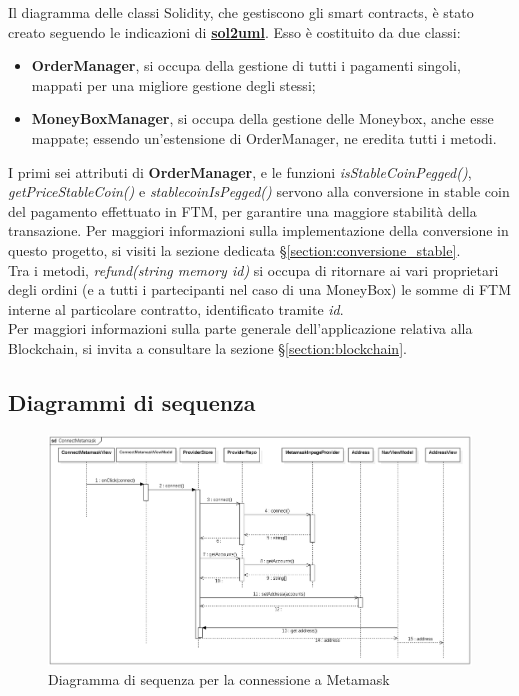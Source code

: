 Il diagramma delle classi Solidity, che gestiscono gli smart contracts, è stato creato seguendo le indicazioni di \href{https://github.com/naddison36/sol2uml}{\textbf{sol2uml}}.
Esso è costituito da due classi:
\begin{itemize}
    \item \textbf{OrderManager}, si occupa della gestione di tutti i pagamenti singoli, mappati per una migliore gestione degli stessi;
    \item \textbf{MoneyBoxManager}, si occupa della gestione delle Moneybox, anche esse mappate; essendo un'estensione di OrderManager, ne eredita tutti i metodi.
\end{itemize}

I primi sei attributi di \textbf{OrderManager}, e le funzioni \textit{isStableCoinPegged()}, \textit{getPriceStableCoin()} e \textit{stablecoinIsPegged()} 
servono alla conversione in stable coin\glo{} del pagamento effettuato in FTM, per garantire una maggiore stabilità della transazione. Per maggiori informazioni sulla implementazione della conversione in questo progetto, si visiti la sezione dedicata §\ref{section:conversione_stable}.\\
Tra i metodi, \textit{refund(string memory id)} si occupa di ritornare ai vari proprietari degli ordini 
(e a tutti i partecipanti nel caso di una MoneyBox) le somme di FTM interne al particolare contratto, identificato tramite \textit{id}.
\\
Per maggiori informazioni sulla parte generale dell'applicazione relativa alla Blockchain, si invita a consultare la sezione §\ref{section:blockchain}.



\subsection{Diagrammi di sequenza}

\begin{figure}[H]
    \centering
    \includegraphics[scale = 0.45]{immagini/diagrammaMeta.png}
    \caption{Diagramma di sequenza per la connessione a Metamask}
\end{figure}

